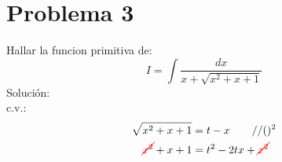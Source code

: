 \section{Problema 3}
    Hallar la funcion primitiva de:
    \begin{equation*}
        I=\int\frac{dx}{x+\sqrt{x^2+x+1}}
    \end{equation*}
    Solución:\\
    c.v.:
    \begin{equation*}
        \begin{split}
            \sqrt{x^2+x+1}&=t-x\qquad //()^2 \\
            \textcolor{red}{\cancel{x^2}}+x+1&=t^2-2tx+\textcolor{red}{\cancel{x^2}}
        \end{split}
    \end{equation*}